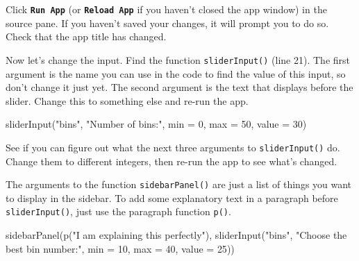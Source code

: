 \documentclass[
  oneside]{book}
\newenvironment{Shaded}{\begin{snugshade}}{\end{snugshade}}
\newcommand{\AttributeTok}[1]{\textcolor[rgb]{0.77,0.63,0.00}{#1}}
\newcommand{\DecValTok}[1]{\textcolor[rgb]{0.00,0.00,0.81}{#1}}
\newcommand{\FunctionTok}[1]{\textcolor[rgb]{0.00,0.00,0.00}{#1}}
\newcommand{\NormalTok}[1]{#1}
\newcommand{\StringTok}[1]{\textcolor[rgb]{0.31,0.60,0.02}{#1}}
\begin{document}
Click \textbf{\texttt{Run\ App}} (or \textbf{\texttt{Reload\ App}} if you haven't closed the app window) in the source pane. If you haven't saved your changes, it will prompt you to do so. Check that the app title has changed.

Now let's change the input. Find the function \texttt{sliderInput}\texttt{()} (line 21). The first argument is the name you can use in the code to find the value of this input, so don't change it just yet. The second argument is the text that displays before the slider. Change this to something else and re-run the app.

\begin{Shaded}
\begin{Highlighting}[]
\FunctionTok{sliderInput}\NormalTok{(}\StringTok{"bins"}\NormalTok{, }\StringTok{"Number of bins:"}\NormalTok{, }\AttributeTok{min =} \DecValTok{0}\NormalTok{, }\AttributeTok{max =} \DecValTok{50}\NormalTok{, }\AttributeTok{value =} \DecValTok{30}\NormalTok{)}
\end{Highlighting}
\end{Shaded}

\begin{try}
See if you can figure out what the next three arguments to \texttt{sliderInput}\texttt{()} do. Change them to different integers, then re-run the app to see what's changed.

\end{try}

The arguments to the function \texttt{sidebarPanel}\texttt{()} are just a list of things you want to display in the sidebar. To add some explanatory text in a paragraph before \texttt{sliderInput}\texttt{()}, just use the paragraph function \texttt{p}\texttt{()}.

\begin{Shaded}
\begin{Highlighting}[]
\FunctionTok{sidebarPanel}\NormalTok{(}\FunctionTok{p}\NormalTok{(}\StringTok{"I am explaining this perfectly"}\NormalTok{), }\FunctionTok{sliderInput}\NormalTok{(}\StringTok{"bins"}\NormalTok{, }\StringTok{"Choose the best bin number:"}\NormalTok{,}
    \AttributeTok{min =} \DecValTok{10}\NormalTok{, }\AttributeTok{max =} \DecValTok{40}\NormalTok{, }\AttributeTok{value =} \DecValTok{25}\NormalTok{))}
\end{Highlighting}
\end{Shaded}
\end{document}
